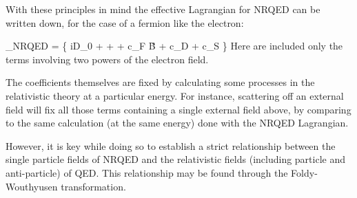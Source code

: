 With these principles in mind the effective Lagrangian for NRQED can be written down, for the case of a fermion like the electron:  

\beq \label{eq:nrLfermion}
_{NRQED} =  \fnrb \Bigg\{
		iD_0 +    + 	
		 + c_F  \gv{\sigma} \cdot \v{B} 
		+ c_D  
	 + c_S 
		\Bigg \} \fnr
\eeq
Here are included only the terms involving two powers of the electron field.

The coefficients themselves are fixed by calculating some processes in the relativistic theory at a particular energy.  For instance, scattering off an external field will fix all those terms containing a single external field above, by comparing to the same calculation (at the same energy) done with the NRQED Lagrangian.  

However, it is key while doing so to establish a strict relationship between the single particle fields of NRQED and the relativistic fields (including particle and anti-particle) of QED.  This relationship may be found through the Foldy-Wouthyusen transformation.